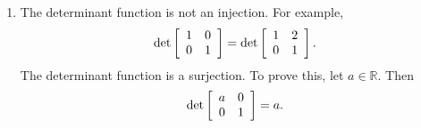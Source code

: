 \documentclass[11pt]{article}
\begin{document}
\begin{enumerate}
\item The determinant function is not an injection.  For example,
\[
\det \left[ {\begin{array}{*{20}c}
   1 & 0  \\
   0 & 1  \\
\end{array} } \right] =  \det \left[ {\begin{array}{*{20}c}
   1 & 2  \\
   0 & 1  \\
 \end{array} } \right].
\]
The determinant function is a surjection.  To prove this, let $a \in \mathbb{R}$.  Then
\[
\det \left[ {\begin{array}{*{20}c}
   a & 0  \\
   0 & 1  \\
\end{array} } \right] =  a.
\]


\end{enumerate}
\end{document}

